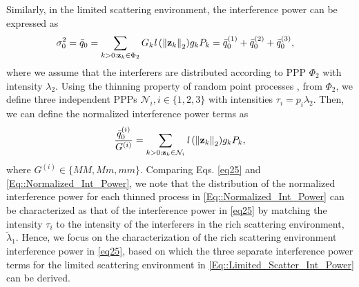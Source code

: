 \documentclass[12pt, draftclsnofoot, onecolumn]{IEEEtran}
\theoremstyle{plain}
\begin{document}
Similarly, in the limited scattering environment, the interference power can be expressed as
\begin{align}
\!\!\!\!\!\! \sigma_0^2 = \bar{q}_0 = \sum\limits_{k>0:\bold{z}_k\in \Phi_2} {G_k \mathit{l}\left({\Vert \bold{z}_k \Vert}_2\right)} g_k P_k = \bar{q}_0^{(1)} + \bar{q}_0^{(2)} + \bar{q}_0^{(3)},\label{Eq::Limited_Scatter_Int_Power}
\end{align}
where we assume that the interferers are distributed according to PPP $\Phi_2$ with intensity $\lambda_2$. Using the thinning property of random point processes \cite{turgut2016coverage}, from $\Phi_2$, we define three independent PPPs $\mathcal{N}_i, i \in \{1,2,3\}$ with intensities $\tau_i = p_i \lambda_2$. Then, we can define the normalized interference power terms as
\begin{align}
\frac{\bar{q}_0^{(i)}}{G^{(i)}} = \sum\limits_{k>0:\bold{z}_k\in \mathcal{N}_i} {\mathit{l}\left({\Vert \bold{z}_k \Vert}_2\right)} g_k P_k, \label{Eq::Normalized_Int_Power}
\end{align}
where $G^{(i)} \in \{MM, Mm, mm \}$. %
Comparing Eqs. \eqref{eq25} and \eqref{Eq::Normalized_Int_Power}, we note that the distribution of the normalized interference power for each thinned process in \eqref{Eq::Normalized_Int_Power} can be characterized as that of the interference power in \eqref{eq25} by matching the intensity $\tau_i$ to the intensity of the interferers in the rich scattering environment, $\tilde{\lambda}_1$. Hence, we focus on the characterization of the rich scattering environment interference power in \eqref{eq25}, based on which the three separate interference power terms for the limited scattering environment in \eqref{Eq::Limited_Scatter_Int_Power} can be derived. 
\end{document}
